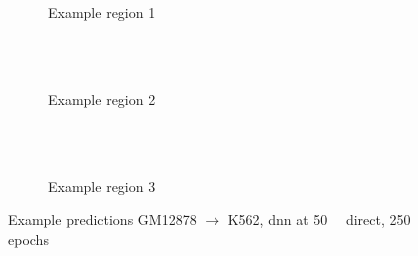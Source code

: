 \begin{figure}[p] %
    \begin{subfigure}{\textwidth}
        \centering
        \caption{Example  region 1} \label{fig:results:50k_r1}
    \end{subfigure}\\[2mm]
    \\[3mm]
    \begin{subfigure}{\textwidth}
        \centering
        \caption{Example region 2} \label{fig:results:50k_r2}
    \end{subfigure}\\[2mm]
    \\[3mm]
    \begin{subfigure}{\textwidth}
        \centering
        \caption{Example region 3} \label{fig:results:50k_r3}
    \end{subfigure}
    \caption{Example predictions GM12878 $\rightarrow$ K562,  \acrshort{dnn} at \SI{50}{\kilo\bp} direct, 250 epochs} \label{fig:results:50k_matrices}
\end{figure}
